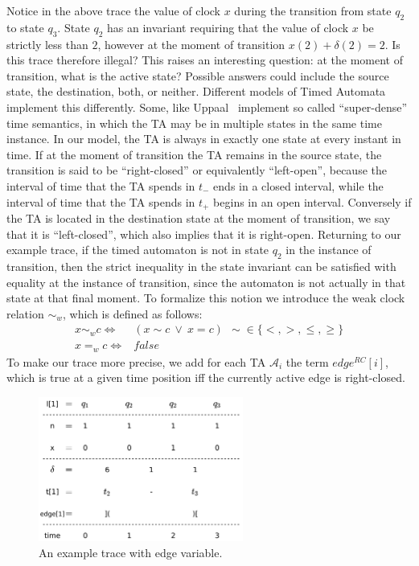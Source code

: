 \documentclass[a4paper,11pt]{report}
\theoremstyle{definition}
\begin{document}
Notice in the above trace the value of clock $x$ during the transition from
state $q_{2}$ to state $q_{3}$. State $q_{2}$ has an invariant requiring that
the value of clock $x$ be strictly less than $2$, however at the moment of
transition $x(2) + \delta(2) = 2$. Is this trace therefore illegal? This raises
an interesting question: at the moment of transition, what is the active state?
Possible answers could include the source state, the destination, both, or
neither. Different models of Timed Automata implement this differently. Some,
like Uppaal~\cite{larsen97} implement so called ``super-dense'' time semantics,
in which the TA may be in multiple states in the same time instance. In our
model, the TA is always in exactly one state at every instant in time. If at the
moment of transition the TA remains in the source state, the transition is said
to be ``right-closed'' or equivalently ``left-open'', because the interval of
time that the TA spends in \(t_{-}\) ends in a closed interval, while the
interval of time that the TA spends in \(t_{+}\) begins in an open interval.
Conversely if the TA is located in the destination state at the moment of
transition, we say that it is ``left-closed'', which also implies that it is
right-open. Returning to our example trace, if the timed automaton is not in
state $q_{2}$ in the instance of transition, then the strict inequality in the
state invariant can be satisfied with equality at the instance of transition,
since the automaton is not actually in that state at that final moment. To
formalize this notion we introduce the weak clock relation $\sim_{w}$, which is
defined as follows:
\begin{align*}
  x \sim_{w} c  \iff & (x \sim c\ \lor\ x = c) \ \ \sim \in \{<,>,\leq,\geq\} \\
  x =_{w} c  \iff & false
\end{align*}
To make our trace more precise, we add for each TA $\mathcal{A}_{i}$ the term
$edge^{RC}[i]$, which is true at a given time position iff the currently active
edge is right-closed.

\begin{figure}[h]
  \centering
  \includegraphics[width=0.6\textwidth]{trace-shift-full}
  \caption{An example trace with edge variable.}
  \label{fig:trace-full}
\end{figure}
\end{document}
